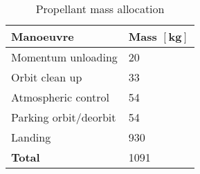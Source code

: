 \begin{table}[ht]
	\centering
	\caption{Propellant mass allocation}
	\label{tab:PropMassBudget}
	\begin{tabular}{|l|l|} \hline
		\textbf {Manoeuvre}             & \textbf{Mass $\mathbf{[kg]}$ } \\ \hline \hline
		Momentum unloading       &		 20       \\ \hline
		Orbit clean up &		  33      \\ \hline
		Atmospheric control           		   &  54      \\ \hline 
		Parking orbit/deorbit            	   & 54    \\ \hline
		Landing            	   &  930     \\ \hline \hline
		\textbf {Total}                 &  1091      \\ \hline
	\end{tabular}
\end{table}
